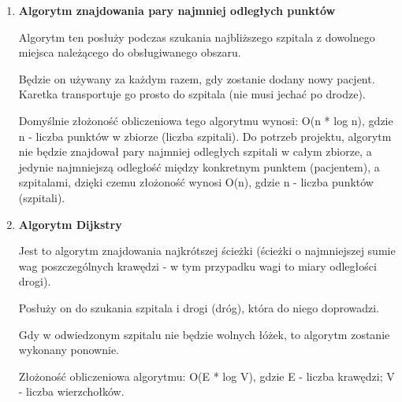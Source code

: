 \documentclass{article}
\begin{document}
{\begin{enumerate}
    Jest to algorytm stwierdzający czy dany punkt (pacjent) znajduje się w obszarze (znalezionej wcześniej otoczce wypukłej).

    Jeżeli tak to dany pacjent zostanie przetransportowany do szpitala (lub kolejnych szpitali w przypadku braku wolnych łóżek).
    
    Jego implementacja znajdzie się w metodzie contains() klasy wielokąta reprezentującego obsługiwany obszar.
    
    Złożoność obliczeniowa algorytmu: O($n^2$), gdzie n - liczba wierzchołków reprezentujących otoczkę wypukłą.

    
    \item \textbf{Algorytm znajdowania pary najmniej odległych punktów}
    
    Algorytm ten posłuży podczas szukania najbliższego szpitala z dowolnego miejsca należącego do obsługiwanego obszaru. 

    Będzie on używany za każdym razem, gdy zostanie dodany nowy pacjent. Karetka transportuje go prosto do szpitala (nie musi jechać po drodze).
    
    Domyślnie złożoność obliczeniowa tego algorytmu wynosi: O(n * log n), gdzie n - liczba punktów w zbiorze (liczba szpitali). 
    Do potrzeb projektu, algorytm nie będzie znajdował pary najmniej odległych szpitali w całym zbiorze, a jedynie najmniejszą odległość między konkretnym punktem (pacjentem), a szpitalami, dzięki czemu złożoność wynosi O(n), gdzie n - liczba punktów (szpitali).
    
    \item \textbf{Algorytm Dijkstry}
    
    Jest to algorytm znajdowania najkrótszej ścieżki (ścieżki o najmniejszej sumie wag poszczególnych krawędzi - w tym przypadku wagi to miary odległości drogi).

    Posłuży on do szukania szpitala i drogi (dróg), która do niego doprowadzi.
    
    Gdy w odwiedzonym szpitalu nie będzie wolnych łóżek, to algorytm zostanie wykonany ponownie.
    
    Złożoność obliczeniowa algorytmu: O(E * log V), gdzie E - liczba krawędzi; V - liczba wierzchołków.

\end{enumerate}

}

\clearpage
{}
\end{document}
